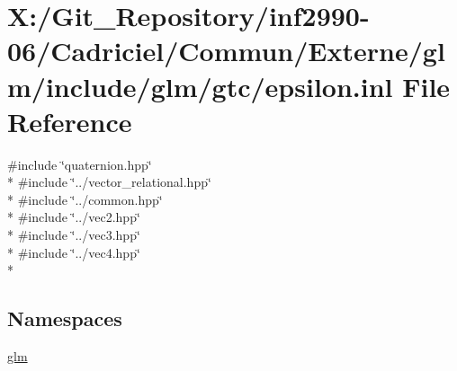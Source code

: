 \hypertarget{epsilon_8inl}{\section{X\-:/\-Git\-\_\-\-Repository/inf2990-\/06/\-Cadriciel/\-Commun/\-Externe/glm/include/glm/gtc/epsilon.inl File Reference}
\label{epsilon_8inl}
}
{\ttfamily \#include \char`\"{}quaternion.\-hpp\char`\"{}}\\*
{\ttfamily \#include \char`\"{}../vector\-\_\-relational.\-hpp\char`\"{}}\\*
{\ttfamily \#include \char`\"{}../common.\-hpp\char`\"{}}\\*
{\ttfamily \#include \char`\"{}../vec2.\-hpp\char`\"{}}\\*
{\ttfamily \#include \char`\"{}../vec3.\-hpp\char`\"{}}\\*
{\ttfamily \#include \char`\"{}../vec4.\-hpp\char`\"{}}\\*
\subsection*{Namespaces}
\begin{DoxyCompactItemize}
\item 
\hyperlink{namespaceglm}{glm}
\end{DoxyCompactItemize}
